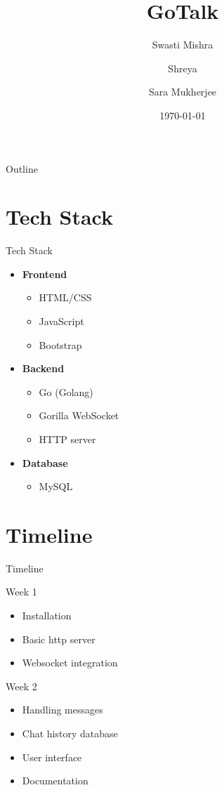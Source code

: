 \documentclass{beamer}
\title{GoTalk}
\author{Swasti Mishra \and Shreya \and Sara Mukherjee}
\date{\today}
\begin{document}
\begin{frame}
    \titlepage
\end{frame}

\begin{frame}{Outline}
    \tableofcontents
\end{frame}

\section{Tech Stack}
\begin{frame}{Tech Stack}
    \begin{itemize}
        \item \textbf{Frontend}
        \begin{itemize}
            \item HTML/CSS
            \item JavaScript
            \item Bootstrap
        \end{itemize}
        \item \textbf{Backend}
        \begin{itemize}
            \item Go (Golang)
            \item Gorilla WebSocket
            \item HTTP server
        \end{itemize}
        \item \textbf{Database}
        \begin{itemize}
            \item MySQL
        \end{itemize}
    \end{itemize}
\end{frame}

\section{Timeline}
\begin{frame}{Timeline}
    \begin{block}{Week 1}
        \begin{itemize}
            \item Installation
            \item Basic http server
            \item Websocket integration
        \end{itemize}
    \end{block}
    
    \begin{block}{Week 2}
        \begin{itemize}
            \item Handling messages
            \item Chat history database
            \item User interface
            \item Documentation
        \end{itemize}
    \end{block}
\end{frame}
\end{document}
